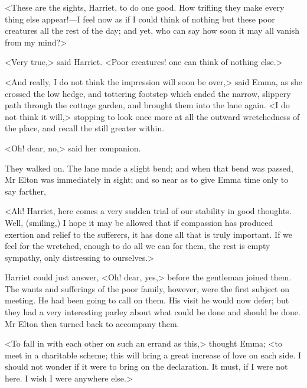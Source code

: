 <These are the sights, Harriet, to do one good. How trifling they make every thing else appear!—I feel now as if I could think of nothing but these poor creatures all the rest of the day; and yet, who can say how soon it may all vanish from my mind?>

<Very true,> said Harriet. <Poor creatures! one can think of nothing else.>

<And really, I do not think the impression will soon be over,> said Emma, as she crossed the low hedge, and tottering footstep which ended the narrow, slippery path through the cottage garden, and brought them into the lane again. <I do not think it will,> stopping to look once more at all the outward wretchedness of the place, and recall the still greater within.

<Oh! dear, no,> said her companion.

They walked on. The lane made a slight bend; and when that bend was passed, Mr Elton was immediately in sight; and so near as to give Emma time only to say farther,

<Ah! Harriet, here comes a very sudden trial of our stability in good thoughts. Well, (smiling,) I hope it may be allowed that if compassion has produced exertion and relief to the sufferers, it has done all that is truly important. If we feel for the wretched, enough to do all we can for them, the rest is empty sympathy, only distressing to ourselves.>

Harriet could just answer, <Oh! dear, yes,> before the gentleman joined them. The wants and sufferings of the poor family, however, were the first subject on meeting. He had been going to call on them. His visit he would now defer; but they had a very interesting parley about what could be done and should be done. Mr Elton then turned back to accompany them.

<To fall in with each other on such an errand as this,> thought Emma; <to meet in a charitable scheme; this will bring a great increase of love on each side. I should not wonder if it were to bring on the declaration. It must, if I were not here. I wish I were anywhere else.>


